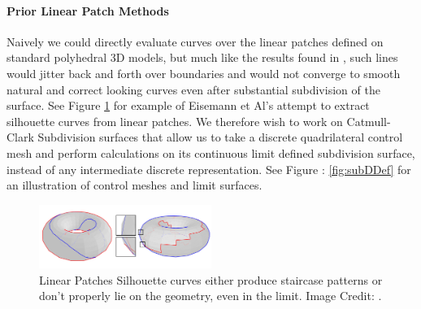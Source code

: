 \documentclass[12pt, letterpaper]{article}
\begin{document}
		\paragraph{Prior Linear Patch Methods}
		Naively we could directly evaluate curves over the linear patches defined on standard polyhedral 3D models,
		but much like the results found in \cite{Eisemann08},
		such lines would jitter back and forth over boundaries and would not converge to smooth natural and correct looking curves even after 
		substantial subdivision of the surface. See Figure \ref{fig:Eisemann_linear_patches} for example of Eisemann et Al's attempt to extract silhouette
		curves from linear patches. We therefore wish to work on Catmull-Clark Subdivision surfaces that allow us to take a discrete quadrilateral control mesh
		and perform calculations on its continuous limit defined subdivision surface, instead of any intermediate discrete representation.
		See Figure : \ref{fig:subDDef} for an illustration of control meshes and limit surfaces.

		\begin{figure}[h]
		\centering
		\includegraphics[width=0.5\textwidth]{Eisemann08_linear_patches}
		\caption{Linear Patches Silhouette curves either produce staircase patterns or don't properly lie on the geometry, even in the limit. Image Credit: \cite{Eisemann08}.}
		\label{fig:Eisemann_linear_patches}
		\end{figure}
\end{document}

